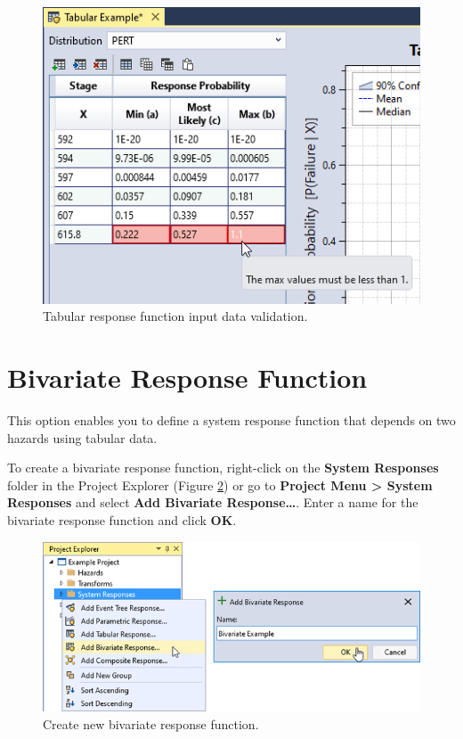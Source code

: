 \documentclass[
]{book}
\begin{document}
\begin{figure}

{\centering \includegraphics{images/figure105} 

}

\caption{Tabular response function input data validation.}\label{fig:figure-105}
\end{figure}

\hypertarget{bivariate-response-function}{%
\section{Bivariate Response Function}\label{bivariate-response-function}}

This option enables you to define a system response function that depends on two hazards using tabular data.

To create a bivariate response function, right-click on the \textbf{System Responses} folder in the Project Explorer (Figure \ref{fig:figure-106}) or go to \textbf{Project Menu \textgreater{} System Responses} and select \textbf{Add Bivariate Response\ldots{}}. Enter a name for the bivariate response function and click \textbf{OK}.

\begin{figure}

{\centering \includegraphics{images/figure106} 

}

\caption{Create new bivariate response function.}\label{fig:figure-106}
\end{figure}
\end{document}
